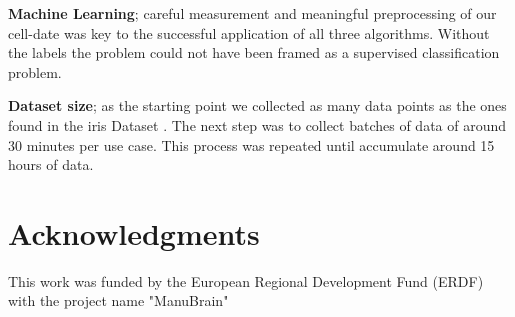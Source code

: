 \documentclass[5p,times,procedia]{elsarticle}
\begin{document}
\textbf{Machine Learning}; careful measurement and  meaningful preprocessing
of our cell-date was key to the successful application of all three algorithms.
Without the labels the problem could not have been framed as a supervised 
classification problem.

\textbf{Dataset size}; as the starting point we collected as many data points as the ones found in the iris Dataset \cite{fisher_1936}. The next step was to collect batches of data of around 30 minutes per use case. This process was repeated until accumulate around 15 hours of data.

\section*{Acknowledgments}
This work was funded by the European Regional Development Fund (ERDF) with the project name "ManuBrain" 


\end{document}
